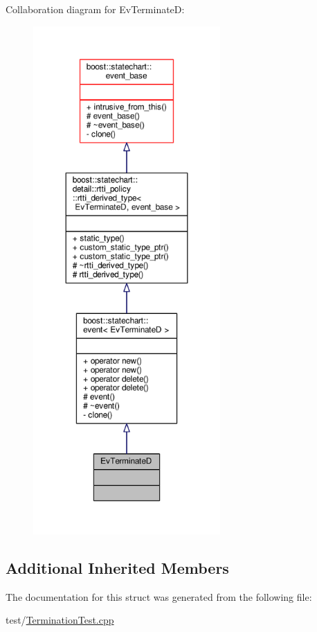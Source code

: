 Collaboration diagram for Ev\+TerminateD\+:
\nopagebreak
\begin{figure}[H]
\begin{center}
\leavevmode
\includegraphics[height=550pt]{struct_ev_terminate_d__coll__graph}
\end{center}
\end{figure}
\subsection*{Additional Inherited Members}


The documentation for this struct was generated from the following file\+:\begin{DoxyCompactItemize}
\item 
test/\mbox{\hyperlink{_termination_test_8cpp}{Termination\+Test.\+cpp}}\end{DoxyCompactItemize}
